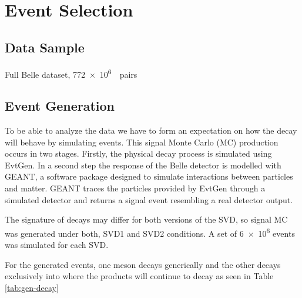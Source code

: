 \documentclass[a4paper]{report}
\begin{document}
\chapter{Event Selection}
\section{Data Sample}
Full Belle dataset, \SI{772e6}{\bbar~pairs}
\section{Event Generation}
To be able to analyze the data we have to form an expectation on how the \ddk
decay will behave by simulating \ddk events. This signal Monte Carlo (MC)
production occurs in two stages. Firstly, the physical decay process is
simulated using EvtGen\cite{evtgen}. In a second step the response of the Belle
detector is modelled with GEANT\cite{geant3}, a software package designed to
simulate interactions between particles and matter. GEANT traces the particles
provided by EvtGen through a simulated detector and returns a signal event
resembling a real detector output.

The signature of \ddk decays may differ for both versions of the SVD, so signal
MC was generated under both, SVD1 and SVD2 conditions. A set of \num{6e6} events
was simulated for each SVD.

For the generated events, one \PB meson decays generically and the other decays
exclusively into \ddk where the products will continue to decay as seen in Table
\ref{tab:gen-decay}
\end{document}
